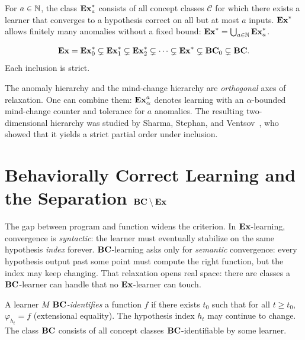 \begin{defn}
\label{def:anomalous-ord}
For $a \in \mathbb{N}$, the class $\mathbf{Ex}_a^*$ consists of all concept classes
$\mathcal{C}$ for which there exists a learner that converges to a
hypothesis correct on all but at most $a$ inputs.  $\mathbf{Ex}^*$ allows
finitely many anomalies without a fixed bound:
$\mathbf{Ex}^* = \bigcup_{a \in \mathbb{N}} \mathbf{Ex}_a^*$.
\end{defn}

\begin{thm}
\label{thm:anomaly-hierarchy}
\[
  \mathbf{Ex} = \mathbf{Ex}_0^* \subsetneq \mathbf{Ex}_1^* \subsetneq \mathbf{Ex}_2^* \subsetneq \cdots
  \subsetneq \mathbf{Ex}^* \subsetneq \mathbf{BC}_0 \subsetneq \mathbf{BC}.
\]
Each inclusion is strict.
\end{thm}

\begin{remark}
\label{rem:anomaly-ordinal}
The anomaly hierarchy and the mind-change hierarchy are \emph{orthogonal}
axes of relaxation.  One can combine them: $\mathbf{Ex}_\alpha^a$ denotes
learning with an $\alpha$-bounded mind-change counter and tolerance for
$a$ anomalies.  The resulting two-dimensional hierarchy was studied by
Sharma, Stephan, and Ventsov~\cite{SharmaStephanVentsov2004}, who
showed that it yields a strict partial order under inclusion.
\end{remark}



\section{Behaviorally Correct Learning and the Separation $\mathbf{BC} \setminus \mathbf{Ex}$}
\label{sec:bc-separation}

The gap between program and function widens the criterion.  In
$\mathbf{Ex}$-learning, convergence is \emph{syntactic}: the learner must eventually
stabilize on the same hypothesis \emph{index} forever.  $\mathbf{BC}$-learning asks
only for \emph{semantic} convergence: every hypothesis output past some
point must compute the right function, but the index may keep changing.
That relaxation opens real space: there are classes a $\mathbf{BC}$-learner can
handle that no $\mathbf{Ex}$-learner can touch.

\begin{defn}
\label{def:bc-learning-ord}
A learner $M$ \emph{$\mathbf{BC}$-identifies} a function $f$ if there exists
$t_0$ such that for all $t \geq t_0$, $\varphi_{h_t} = f$
(extensional equality).  The hypothesis index $h_t$ may continue
to change.  The class $\mathbf{BC}$ consists of all concept classes
$\mathbf{BC}$-identifiable by some learner.
\end{defn}

